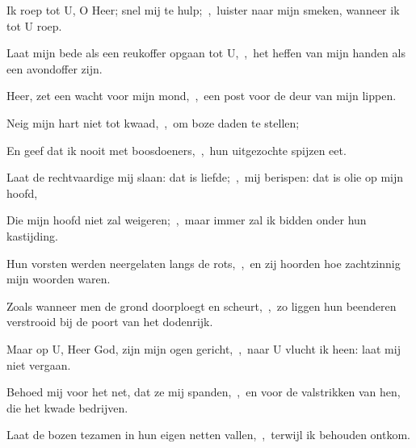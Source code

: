 \documentclass[12pt,twoside,a5paper]{article}
\begin{document}
\begin{halfparskip}
  Ik roep tot U, O Heer; snel mij te hulp;~\sep\ luister naar mijn smeken, wanneer ik tot U roep.


  Laat mijn bede als een reukoffer opgaan tot U,~\sep\ het heffen van mijn handen als een avondoffer zijn.

  Heer, zet een wacht voor mijn mond,~\sep\ een post voor de deur van mijn lippen.

  Neig mijn hart niet tot kwaad,~\sep\ om boze daden te stellen;

  En geef dat ik nooit met boosdoeners,~\sep\ hun uitgezochte spijzen eet.

  Laat de rechtvaardige mij slaan: dat is liefde;~\sep\ mij berispen: dat is olie op mijn hoofd,

  Die mijn hoofd niet zal weigeren;~\sep\ maar immer zal ik bidden onder hun kastijding.

  Hun vorsten werden neergelaten langs de rots,~\sep\ en zij hoorden hoe zachtzinnig mijn woorden waren.

  Zoals wanneer men de grond doorploegt en scheurt,~\sep\ zo liggen hun beenderen verstrooid bij de poort van het dodenrijk.

  Maar op U, Heer God, zijn mijn ogen gericht,~\sep\ naar U vlucht ik heen: laat mij niet vergaan.

  Behoed mij voor het net, dat ze mij spanden,~\sep\ en voor de valstrikken van hen, die het kwade bedrijven.

  Laat de bozen tezamen in hun eigen netten vallen,~\sep\ terwijl ik behouden ontkom.
\end{halfparskip}





\end{document}
